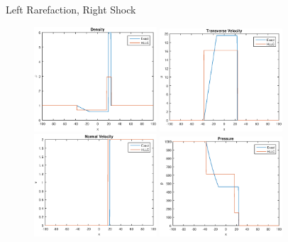 \documentclass{beamer}
\begin{document}
\begin{frame}{Left Rarefaction, Right Shock}
\begin{figure}[ht]
\centering
\includegraphics[width=1.8in]{lRareDen}
\includegraphics[width=1.8in]{lRareU}\\
\includegraphics[width=1.8in]{lRareV}
\includegraphics[width=1.8in]{lRareP}
\end{figure}
\end{frame}
\end{document}
